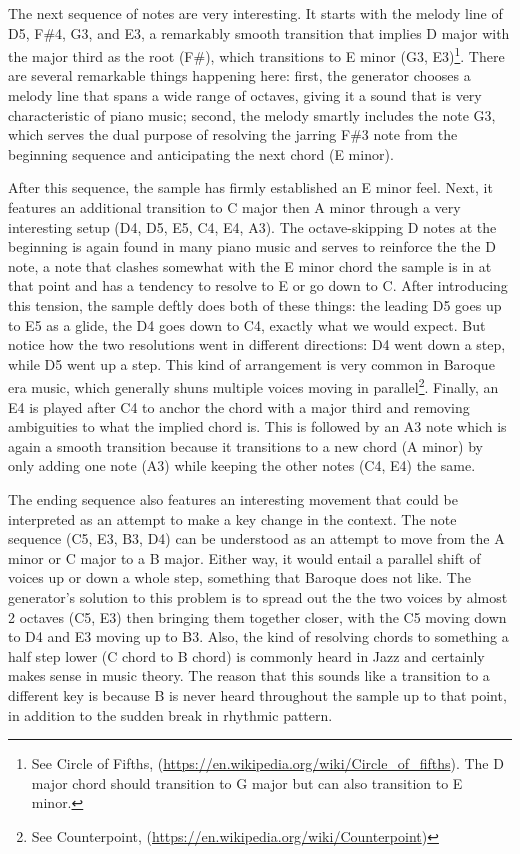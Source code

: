 \documentclass[12pt,oneside]{chicagocapstone}
\begin{document}
The next sequence of notes are very interesting. It starts with the melody line of D5, F\#4, G3, and E3, a remarkably smooth transition that implies D major with the major third as the root (F\#), which transitions to E minor (G3, E3)\footnote{See Circle of Fifths, (\url{https://en.wikipedia.org/wiki/Circle_of_fifths}). The D major chord should transition to G major but can also transition to E minor.}. There are several remarkable things happening here: first, the generator chooses a melody line that spans a wide range of octaves, giving it a sound that is very characteristic of piano music; second, the melody smartly includes the note G3, which serves the dual purpose of resolving the jarring F\#3 note from the beginning sequence and anticipating the next chord (E minor).

After this sequence, the sample has firmly established an E minor feel. Next, it features an additional transition to C major then A minor through a very interesting setup (D4, D5, E5, C4, E4, A3). The octave-skipping D notes at the beginning is again found in many piano music and serves to reinforce the the D note, a note that clashes somewhat with the E minor chord the sample is in at that point and has a tendency to resolve to E or go down to C. After introducing this tension, the sample deftly does both of these things: the leading D5 goes up to E5 as a glide, the D4 goes down to C4, exactly what we would expect. But notice how the two resolutions went in different directions: D4 went down a step, while D5 went up a step. This kind of arrangement is very common in Baroque era music, which generally shuns multiple voices moving in parallel\footnote{See Counterpoint, (\url{https://en.wikipedia.org/wiki/Counterpoint})}. Finally, an E4 is played after C4 to anchor the chord with a major third and removing ambiguities to what the implied chord is. This is followed by an A3 note which is again a smooth transition because it transitions to a new chord (A minor) by only adding one note (A3) while keeping the other notes (C4, E4) the same.

The ending sequence also features an interesting movement that could be interpreted as an attempt to make a key change in the context. The note sequence (C5, E3, B3, D4) can be understood as an attempt to move from the A minor or C major to a B major. Either way, it would entail a parallel shift of voices up or down a whole step, something that Baroque does not like. The generator's solution to this problem is to spread out the the two voices by almost 2 octaves (C5, E3) then bringing them together closer, with the C5 moving down to D4 and E3 moving up to B3. Also, the kind of resolving chords to something a half step lower (C chord to B chord) is commonly heard in Jazz and certainly makes sense in music theory. The reason that this sounds like a transition to a different key is because B is never heard throughout the sample up to that point, in addition to the sudden break in rhythmic pattern.
\end{document}
